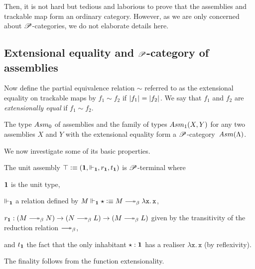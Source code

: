 \documentclass[a4paper,UKenglish,numberwithinsect,cleveref,thm-restate]{lipics-v2021}
\numberwithin{equation}{section}
\theoremstyle{plain}
\begin{document}
Then, it is not hard but tedious and laborious to prove that the assemblies and trackable map form an ordinary category.
However, as we are only concerned about $\mathscr{P}$-categories, we do not elaborate details here.



\subsection{Extensional equality and \texorpdfstring{$\mathscr{P}$}{P}-category of assemblies}

Now define the partial equivalence relation $\sim$ referred to as the extensional equality on trackable maps by $f_1 \sim f_2$ if $\mathopen{}\left|f_1\right|_{}^{}\mathclose{} = \mathopen{}\left|f_2\right|_{}^{}\mathclose{}$. We say that $f_1$ and $f_2$ are \emph{extensionally equal} if $f_1 \sim f_2$.
\begin{proposition}
  The type $\Asm_0$ of assemblies and the family of types $\Asm_1(X, Y)$ for any two assemblies $X$ and $Y$ with the extensional equality form a $\mathscr{P}$-category~$\Asm(\Lambda)$.
\end{proposition}

We now investigate some of its basic properties.

\begin{example}
  The unit assembly $\top \vcentcolon\equiv (\mathbf{1}, \Vdash_{\mathbf{1}}, r_{\mathbf{1}}, t_{\mathbf{1}})$ is $\mathscr{P}$-terminal where 
  \begin{romanenumerate}
    \item $\mathbf{1}$ is the unit type,  
    \item $\Vdash_{\mathbf{1}}$ a relation defined by $M \Vdash_{\Unit} \star \defeq M \reduce \mathtt{\lambda x.\, x}$, 
    \item $r_{\Unit}: (M \reduce N) \to (N \reduce L) \to (M \reduce L)$ given by the transitivity of the reduction relation $\reduce$,
    \item and $t_{\mathbf{1}}$ the fact that the only inhabitant $\star : \mathbf{1}$ has a realiser $\mathtt{\lambda x.\, x}$ (by reflexivity).
  \end{romanenumerate}
  The finality follows from the function extensionality.
\end{example}
\end{document}

